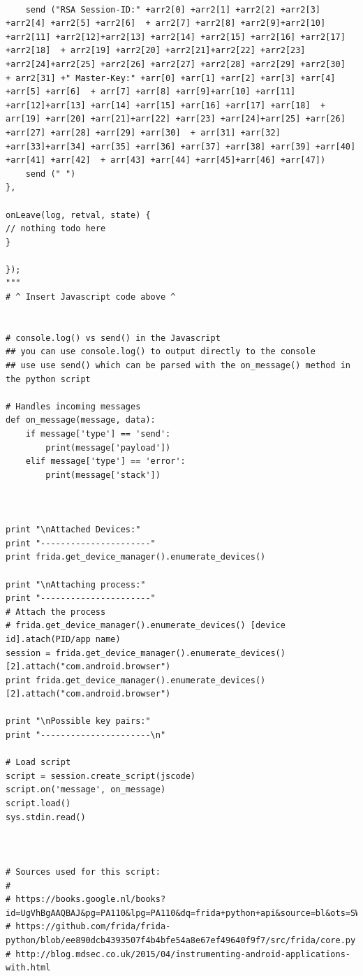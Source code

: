 \documentclass[12pt, a4paper]{report}
\begin{document}
\begin{appendices}
\begin{lstlisting}[frame=single, breaklines=true]
 
	send ("RSA Session-ID:" +arr2[0] +arr2[1] +arr2[2] +arr2[3] +arr2[4] +arr2[5] +arr2[6]  + arr2[7] +arr2[8] +arr2[9]+arr2[10] +arr2[11] +arr2[12]+arr2[13] +arr2[14] +arr2[15] +arr2[16] +arr2[17] +arr2[18]  + arr2[19] +arr2[20] +arr2[21]+arr2[22] +arr2[23] +arr2[24]+arr2[25] +arr2[26] +arr2[27] +arr2[28] +arr2[29] +arr2[30]  + arr2[31] +" Master-Key:" +arr[0] +arr[1] +arr[2] +arr[3] +arr[4] +arr[5] +arr[6]  + arr[7] +arr[8] +arr[9]+arr[10] +arr[11] +arr[12]+arr[13] +arr[14] +arr[15] +arr[16] +arr[17] +arr[18]  + arr[19] +arr[20] +arr[21]+arr[22] +arr[23] +arr[24]+arr[25] +arr[26] +arr[27] +arr[28] +arr[29] +arr[30]  + arr[31] +arr[32] +arr[33]+arr[34] +arr[35] +arr[36] +arr[37] +arr[38] +arr[39] +arr[40] +arr[41] +arr[42]  + arr[43] +arr[44] +arr[45]+arr[46] +arr[47])
	send (" ")
},
 
onLeave(log, retval, state) {
// nothing todo here
}
 
});
"""
# ^ Insert Javascript code above ^
 
 
# console.log() vs send() in the Javascript
## you can use console.log() to output directly to the console
## use use send() which can be parsed with the on_message() method in the python script 
 
# Handles incoming messages
def on_message(message, data):
    if message['type'] == 'send':
        print(message['payload'])
    elif message['type'] == 'error':
        print(message['stack'])
 
 
 
print "\nAttached Devices:"
print "----------------------"
print frida.get_device_manager().enumerate_devices()
 
print "\nAttaching process:"
print "----------------------"
# Attach the process
# frida.get_device_manager().enumerate_devices() [device id].atach(PID/app name)
session = frida.get_device_manager().enumerate_devices() [2].attach("com.android.browser")
print frida.get_device_manager().enumerate_devices() [2].attach("com.android.browser")
 
print "\nPossible key pairs:"
print "----------------------\n"
 
# Load script
script = session.create_script(jscode)
script.on('message', on_message)
script.load()
sys.stdin.read()
 
 
 
# Sources used for this script:
#
# https://books.google.nl/books?id=UgVhBgAAQBAJ&pg=PA110&lpg=PA110&dq=frida+python+api&source=bl&ots=SWy8q9e9PU&sig=cSHShKFcICRZVuFdMwAMG0qmyHo&hl=nl&sa=X&ved=0ahUKEwjczvKdkMrJAhUEDw8KHbIkDmYQ6AEIWTAH#v=onepage&q=frida%20python%20api&f=false
# https://github.com/frida/frida-python/blob/ee890dcb4393507f4b4bfe54a8e67ef49640f9f7/src/frida/core.py
# http://blog.mdsec.co.uk/2015/04/instrumenting-android-applications-with.html


\end{lstlisting}




\end{appendices}
\end{document}
